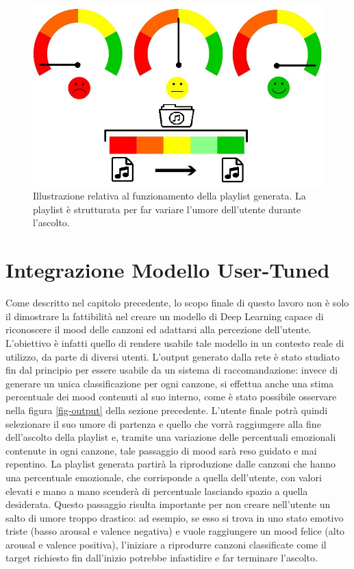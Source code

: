 \documentclass[11pt]{report}
\begin{document}
\begin{figure}[h]
\centering
\includegraphics[scale = 1.5]{img/playlist-emotion.jpg}
\caption{Illustrazione relativa al funzionamento della playlist generata. La playlist è strutturata per far variare l'umore dell'utente durante l'ascolto.}
\label{fig:playlist-emozioni}
\end{figure}


\section{Integrazione Modello User-Tuned}

Come descritto nel capitolo precedente, lo scopo finale di questo lavoro non è solo il dimostrare la fattibilità nel creare un modello di Deep Learning capace di riconoscere il mood delle canzoni ed adattarsi alla percezione dell'utente. L'obiettivo è infatti quello di rendere usabile tale modello in un contesto reale di utilizzo, da parte di diversi utenti. L'output generato dalla rete è stato studiato fin dal principio per essere usabile da un sistema di raccomandazione: invece di generare un unica classificazione per ogni canzone, si effettua anche una stima percentuale dei mood contenuti al suo interno, come è stato possibile osservare nella figura \ref{fig-output} della sezione precedente. L'utente finale potrà quindi selezionare il suo umore di partenza e quello che vorrà raggiungere alla fine dell'ascolto della playlist e, tramite una variazione delle percentuali emozionali contenute in ogni canzone, tale passaggio di mood sarà reso guidato e mai repentino. La playlist generata partirà la riproduzione dalle canzoni che hanno una percentuale emozionale, che corrisponde a quella dell'utente, con valori elevati e mano a mano scenderà di percentuale lasciando spazio a quella desiderata. Questo passaggio risulta importante per non creare nell'utente un salto di umore troppo drastico: ad esempio, se esso si trova in uno stato emotivo triste (basso arousal e valence negativa) e vuole raggiungere un mood felice (alto arousal e valence positiva), l'iniziare a riprodurre canzoni classificate come il target richiesto fin dall'inizio potrebbe infastidire e far terminare l'ascolto.
\end{document}

